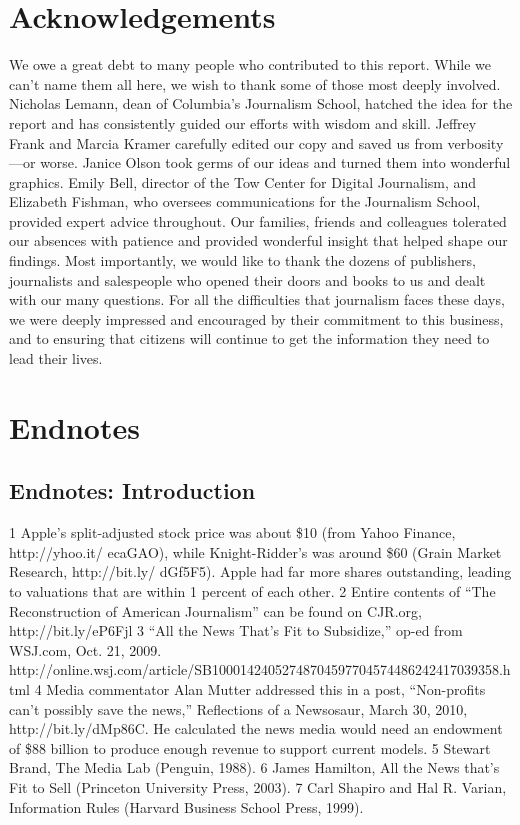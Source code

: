 \chapter{Acknowledgements}
We owe a great debt to many people who contributed to this report. While we
can’t name them all here, we wish to thank some of those most deeply involved.
Nicholas Lemann, dean of Columbia’s Journalism School, hatched the idea
for the report and has consistently guided our efforts with wisdom and skill.
Jeffrey Frank and Marcia Kramer carefully edited our copy and saved us from
verbosity—or worse. Janice Olson took germs of our ideas and turned them into
wonderful graphics. Emily Bell, director of the Tow Center for Digital Journalism,
and Elizabeth Fishman, who oversees communications for the Journalism
School, provided expert advice throughout.
Our families, friends and colleagues tolerated our absences with patience and
provided wonderful insight that helped shape our findings.
Most importantly, we would like to thank the dozens of publishers, journalists
and salespeople who opened their doors and books to us and dealt with our
many questions. For all the difficulties that journalism faces these days, we were
deeply impressed and encouraged by their commitment to this business, and to
ensuring that citizens will continue to get the information they need to lead
their lives.

\chapter{Endnotes}
\section{Endnotes: Introduction}
1 Apple’s split-adjusted stock price was about \$10 (from Yahoo Finance, http://yhoo.it/
ecaGAO), while Knight-Ridder’s was around \$60 (Grain Market Research, http://bit.ly/
dGf5F5). Apple had far more shares outstanding, leading to valuations that are within 1 percent
of each other.
2 Entire contents of “The Reconstruction of American Journalism” can be found on CJR.org,
http://bit.ly/eP6Fjl
3 “All the News That’s Fit to Subsidize,” op-ed from WSJ.com, Oct. 21, 2009.
http://online.wsj.com/article/SB10001424052748704597704574486242417039358.html
4 Media commentator Alan Mutter addressed this in a post, “Non-profits can’t possibly save the
news,” Reflections of a Newsosaur, March 30, 2010, http://bit.ly/dMp86C. He calculated the
news media would need an endowment of \$88 billion to produce enough revenue to support
current models.
5 Stewart Brand, The Media Lab (Penguin, 1988).
6 James Hamilton, All the News that’s Fit to Sell (Princeton University Press, 2003).
7 Carl Shapiro and Hal R. Varian, Information Rules (Harvard Business School Press, 1999).


